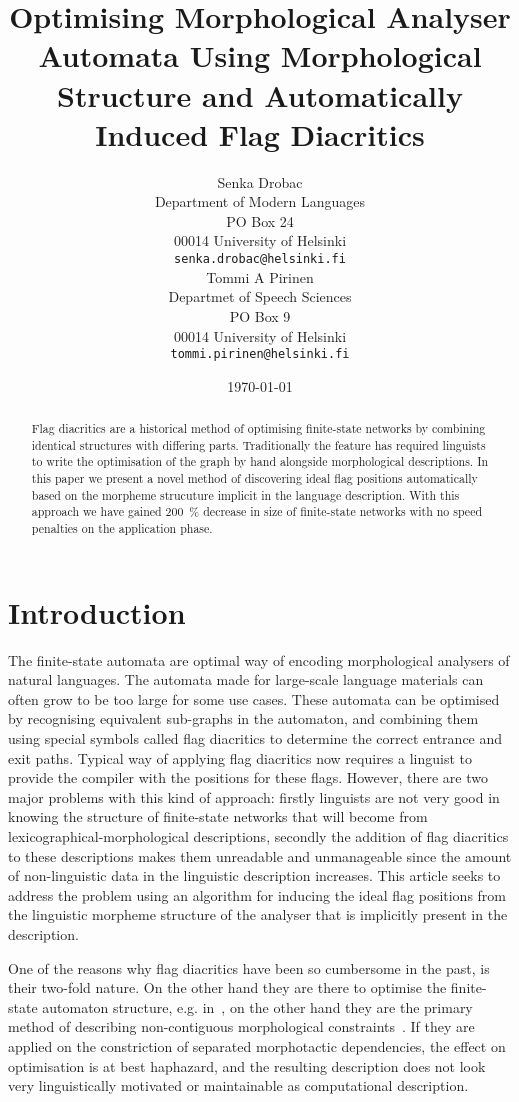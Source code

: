 \documentclass[11pt]{article}
\title{Optimising Morphological Analyser Automata Using Morphological Structure
and Automatically Induced Flag Diacritics}
\author{Senka Drobac \\
Department of Modern Languages \\
PO Box 24 \\
00014 University of Helsinki \\
  {\tt senka.drobac@helsinki.fi} \\\And
  Tommi A Pirinen \\
Departmet of Speech Sciences\\
PO Box 9\\
00014 University of Helsinki\\
  {\tt tommi.pirinen@helsinki.fi} \\}
\date{\today}
\begin{document}
\maketitle
\begin{abstract}
    Flag diacritics are a historical method of optimising finite-state networks
    by combining identical structures with differing parts. Traditionally the
    feature has required linguists to write the optimisation of the graph by
    hand alongside morphological descriptions. In this paper we present a novel
    method of discovering ideal flag positions automatically based on the
    morpheme strucuture implicit in the language description. With this
    approach we have gained 200~\% decrease in size of finite-state networks
    with no speed penalties on the application phase.
\end{abstract}

\section{Introduction}

The finite-state automata are optimal way of encoding morphological analysers
of natural languages. The automata made for large-scale language materials can
often grow to be too large for some use cases. These automata can be optimised
by recognising equivalent sub-graphs in the automaton, and combining them using
special symbols called flag diacritics to determine the correct entrance and
exit paths. Typical way of applying flag diacritics now requires a linguist to
provide the compiler with the positions for these flags. However, there are two
major problems with this kind of approach: firstly linguists are not very good
in knowing the structure of finite-state networks that will become from
lexicographical-morphological descriptions, secondly the addition of flag
diacritics to these descriptions makes them unreadable and unmanageable since
the amount of non-linguistic data in the linguistic description increases. This
article seeks to address the problem using an algorithm for inducing the ideal
flag positions from the linguistic morpheme structure of the analyser that is
implicitly present in the description. 

One of the reasons why flag diacritics have been so cumbersome in the past,
is their two-fold nature. On the other hand they are there to optimise the
finite-state automaton structure, e.g. in~\cite{karttunen2006numbers}, on the
other hand they are the primary method of describing non-contiguous 
morphological constraints~\cite{beesley1998constraining}. If they are applied
on the constriction of separated morphotactic dependencies, the effect on
optimisation is at best haphazard, and the resulting description does not
look very linguistically motivated or maintainable as computational description.
\end{document}

